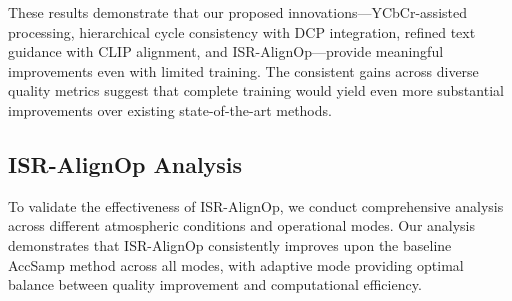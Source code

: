 \documentclass{article}
\begin{document}
These results demonstrate that our proposed innovations—YCbCr-assisted processing, hierarchical cycle consistency with DCP integration, refined text guidance with CLIP alignment, and ISR-AlignOp—provide meaningful improvements even with limited training. The consistent gains across diverse quality metrics suggest that complete training would yield even more substantial improvements over existing state-of-the-art methods.

\begin{table}[t]
\centering
\caption{Quantitative comparison of various dehazing methods on RTTS dataset. \textbf{Bold} numbers indicate best performance. *Results obtained from checkpoints trained for 20,000 steps with batch size 24 (preliminary results from incomplete training).}
\label{tab:quantitative_comparison}
\end{table}

\subsection{ISR-AlignOp Analysis}

To validate the effectiveness of ISR-AlignOp, we conduct comprehensive analysis across different atmospheric conditions and operational modes. Our analysis demonstrates that ISR-AlignOp consistently improves upon the baseline AccSamp method across all modes, with adaptive mode providing optimal balance between quality improvement and computational efficiency.
\end{document}

